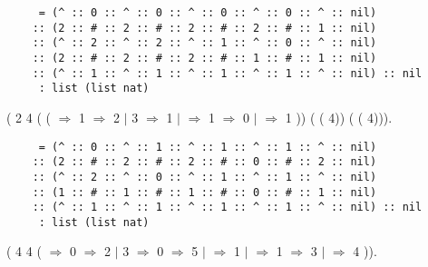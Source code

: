 \documentclass[12pt]{report}
\begin{document}
\begin{verbatim}
     = (^ :: 0 :: ^ :: 0 :: ^ :: 0 :: ^ :: 0 :: ^ :: nil)
    :: (2 :: # :: 2 :: # :: 2 :: # :: 2 :: # :: 1 :: nil)
    :: (^ :: 2 :: ^ :: 2 :: ^ :: 1 :: ^ :: 0 :: ^ :: nil)
    :: (2 :: # :: 2 :: # :: 2 :: # :: 1 :: # :: 1 :: nil)
    :: (^ :: 1 :: ^ :: 1 :: ^ :: 1 :: ^ :: 1 :: ^ :: nil) :: nil
     : list (list nat)
\end{verbatim}
  \begin{coqdoccode}
\coqdocemptyline
\coqdocnoindent
{} ( 2 4 ( (   \ensuremath{\Rightarrow}    1 \ensuremath{\Rightarrow} 2 \ensuremath{|} 3 \ensuremath{\Rightarrow} 1 \ensuremath{|} \coqdocvar{\_} \ensuremath{\Rightarrow}    1 \ensuremath{\Rightarrow} 0 \ensuremath{|} \coqdocvar{\_} \ensuremath{\Rightarrow} 1  )) ( ( 4)) ( ( 4))).\coqdoceol
\end{coqdoccode}
 
\begin{verbatim}
     = (^ :: 0 :: ^ :: 1 :: ^ :: 1 :: ^ :: 1 :: ^ :: nil)
    :: (2 :: # :: 2 :: # :: 2 :: # :: 0 :: # :: 2 :: nil)
    :: (^ :: 2 :: ^ :: 0 :: ^ :: 1 :: ^ :: 1 :: ^ :: nil)
    :: (1 :: # :: 1 :: # :: 1 :: # :: 0 :: # :: 1 :: nil)
    :: (^ :: 1 :: ^ :: 1 :: ^ :: 1 :: ^ :: 1 :: ^ :: nil) :: nil
     : list (list nat)
\end{verbatim}
  \begin{coqdoccode}
\coqdocemptyline
\coqdocnoindent
{} ( 4 4 (   \ensuremath{\Rightarrow}    0 \ensuremath{\Rightarrow} 2 \ensuremath{|} 3 \ensuremath{\Rightarrow}    0 \ensuremath{\Rightarrow} 5 \ensuremath{|} \coqdocvar{\_} \ensuremath{\Rightarrow} 1  \ensuremath{|} \coqdocvar{\_} \ensuremath{\Rightarrow}    1 \ensuremath{\Rightarrow} 3 \ensuremath{|} \coqdocvar{\_} \ensuremath{\Rightarrow} 4  )).\coqdoceol
\end{coqdoccode}
 
\end{document}
